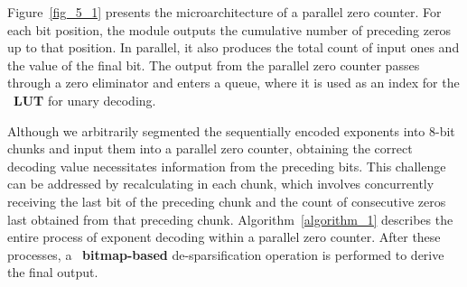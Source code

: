 Figure~\ref{fig_5_1} presents the microarchitecture of a parallel zero counter. For each bit position, the module outputs the cumulative number of preceding zeros up to that position. In parallel, it also produces the total count of input ones and the value of the final bit. The output from the parallel zero counter passes through a zero eliminator and enters a queue, where it is used as an index for the ~\textbf{LUT} for unary decoding. 


Although we arbitrarily segmented the sequentially encoded exponents into 8-bit chunks and input them into a parallel zero counter, obtaining the correct decoding value necessitates information from the preceding bits. This challenge can be addressed by recalculating in each chunk, which involves concurrently receiving the last bit of the preceding chunk and the count of consecutive zeros last obtained from that preceding chunk. Algorithm~\ref{algorithm_1} describes the entire process of exponent decoding within a parallel zero counter. After these processes, a ~\textbf{bitmap-based} de-sparsification operation is performed to derive the final output.

